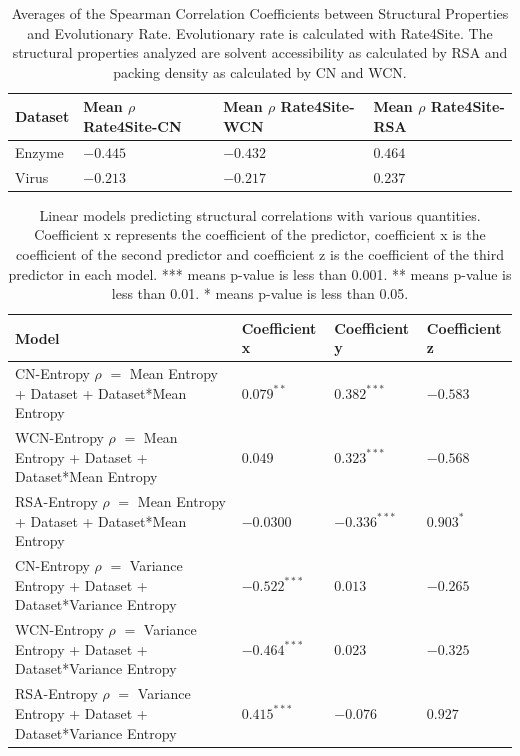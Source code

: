 \documentclass[12pt]{article}
\begin{document}
\begin{center}
	\begin{table}[H]
	\begin{tabular}{| p{1.5cm} | p{2.5cm} | p{2cm} | p{2cm} |  }
		\hline
		Dataset & Mean $\rho$ Rate4Site-CN  & Mean $\rho$ Rate4Site-WCN & Mean $\rho$ Rate4Site-RSA \\
		\hline	
		Enzyme &  $-0.445$  & $-0.432$ & $0.464$ \\
		\hline
		Virus & $-0.213$ & $-0.217$ & $0.237$ \\
		\hline	
	\end{tabular}
	\caption{Averages of the Spearman Correlation Coefficients between Structural Properties and Evolutionary Rate. Evolutionary rate is calculated with Rate4Site. The structural properties analyzed are solvent accessibility as calculated by RSA and packing density as calculated by CN and WCN.}
	\label{table:rate_stats}
	\end{table}
\end{center}

\begin{center}
	\begin{table}[H]
	\begin{tabular}{ | p{5.0cm} | p{3cm} | p{3cm} | p{3cm} | }
	\hline
	Model & Coefficient x  & Coefficient y & Coefficient z \\	
	\hline
	CN-Entropy $\rho$ $ = $ Mean Entropy + Dataset + Dataset*Mean Entropy & $0.079 ^{**}$ & $0.382^{***}$  & $-0.583$ \\	
	\hline
	WCN-Entropy $\rho$ $ = $ Mean Entropy + Dataset + Dataset*Mean Entropy & $0.049$ & $0.323^{***}$ & $-0.568$  \\	
	\hline

	RSA-Entropy $\rho$ $ = $ Mean Entropy + Dataset + Dataset*Mean Entropy &  $-0.0300$ & $-0.336^{***}$ & $0.903^{*}$ \\	

	\hline
	CN-Entropy $\rho$ $ = $ Variance Entropy + Dataset + Dataset*Variance Entropy & $-0.522^{***}$ &  $0.013$ & $-0.265$ \\	
	\hline
	WCN-Entropy $\rho$ $ = $ Variance Entropy + Dataset + Dataset*Variance Entropy & $-0.464^{***}$ &  $0.023$ & $-0.325$ \\	
	\hline
	RSA-Entropy $\rho$ $ = $ Variance Entropy + Dataset + Dataset*Variance Entropy & $0.415^{***}$ & $-0.076$ & $0.927$ \\	

	\hline
	\end{tabular}
	\caption{Linear models predicting structural correlations with various quantities. Coefficient x represents the coefficient of the predictor, coefficient x is the coefficient of the second predictor and coefficient z is the coefficient of the third predictor in each model.  *** means p-value is less than 0.001. ** means p-value is less than 0.01.  * means p-value is less than 0.05. }
	\label{table:model_stats}
	\end{table}
\end{center}
\end{document}
